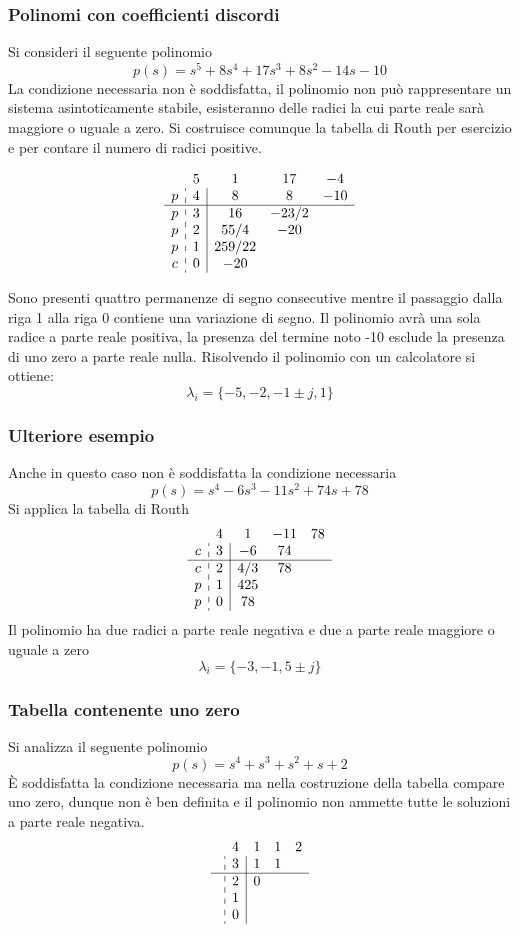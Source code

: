 
\subsubsection{Polinomi con coefficienti discordi}
Si consideri il seguente polinomio
$$
p(s) = s^5 + 8s^4 + 17s^3 + 8s^2 -14s - 10
$$
La condizione necessaria non è soddisfatta, il polinomio non può rappresentare
un sistema asintoticamente stabile, esisteranno delle radici la cui parte reale
sarà maggiore o uguale a zero.
Si costruisce comunque la tabella di Routh per esercizio e per contare il
numero di radici positive.
\begin{table}[h]
$$
\begin{array}{c:c|ccc}
& 5 & 1 & 17 & -4 \\
p & 4 & 8 & 8 & -10 \\ \hline
p & 3 & 16 &-23/2 \\
p & 2 & 55/4 & -20 \\
p & 1 & 259/22 \\
c & 0 & -20
\end{array}
$$
\end{table}
Sono presenti quattro permanenze di segno consecutive mentre il passaggio dalla
riga 1 alla riga 0 contiene una variazione di segno. Il polinomio avrà una sola
radice a parte reale positiva, la presenza del termine noto -10 esclude la
presenza di uno zero a parte reale nulla.
Risolvendo il polinomio con un calcolatore si ottiene:
$$
\lambda_i = \{ -5,-2,-1\pm j,1 \}
$$

\subsubsection{Ulteriore esempio}
Anche in questo caso non è soddisfatta la condizione necessaria
$$
p(s) = s^4 - 6s^3 - 11s^2 + 74 s + 78
$$
Si applica la tabella di Routh
$$
\begin{array}{c:c|ccc}
&4 & 1 & -11 & 78\\
c&3 & -6 & 74 \\ \hline
c&2 & 4/3 & 78 \\
p&1 & 425 \\
p&0 & 78
\end{array}
$$
Il polinomio ha due radici a parte reale negativa e due a parte reale maggiore
o uguale a zero
$$
\lambda_i = \{-3,-1,5\pm j\}
$$

\newpage
\subsubsection{Tabella contenente uno zero}
Si analizza il seguente polinomio
$$
p(s) = s^4 + s^3 + s^2 + s + 2
$$
È soddisfatta la condizione necessaria ma nella costruzione della tabella
compare uno zero, dunque non è ben definita e il polinomio non ammette tutte le
soluzioni a parte reale negativa.
$$
\begin{array}{c:c|cccc}
 & 4 & 1 & 1 & 2 \\
 & 3 & 1 & 1 \\ \hline
 & 2 & 0  \\
 & 1 \\
 & 0
\end{array}
$$

